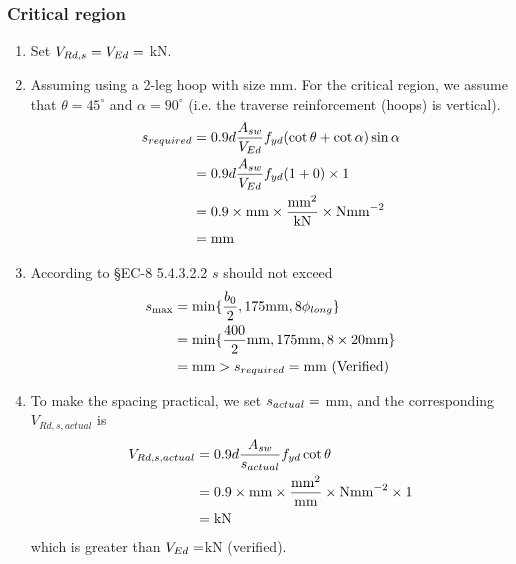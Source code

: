 \subsubsection{Critical region}
\begin{enumerate}
\item Set $V_{Rd,s} = V_{Ed} = \g{VEd}$ kN.
\item Assuming using a 2-leg hoop with size  mm. For the critical
  region, we assume that $\theta = 45 ^{\circ}$ and $\alpha = 90 ^{\circ}$ (i.e.
  the traverse reinforcement (hoops) is vertical).
  \begin{align*}
    s_{required} &= 0.9d \frac{A_{sw}}{V_{Ed}} f_{yd}
                   (\cot \theta + \cot \alpha)\sin \alpha \\
                 &= 0.9d \frac{A_{sw}}{V_{Ed}} f_{yd} (1 + 0) \times 1\\
                 &= 0.9 \times \g{d} \mbox{mm}
                   \times
                   \frac{\g{Asw}\mbox{mm}^{2}}{\g{VEd} \mbox{kN}}
                   \times \g{fyd} \mbox{Nmm}^{-2} \\
                 &= \g{sreq} \mbox{mm}
  \end{align*}
\item According to \S EC-8 5.4.3.2.2 $s$ should not exceed
  \begin{align*}
    s_{\max} &= \min \{
               \frac{b_0}{2}, 175 \mbox{mm}, 8\phi_{long} \} \\
             &= \min \{ \frac{400}{2} \mbox{mm},
               175\mbox{mm}, 8 \times 20 \mbox{mm}\} \\
             &= \g{smax}
               \mbox{mm} > s_{required} = \g{sreq} \mbox{mm (Verified)} \\
  \end{align*}
\item To make the spacing practical, we set $s_{actual} = \g{sact}$ mm, and
  the corresponding $V_{Rd, s, actual} $ is
\begin{align*}
  V_{Rd, s, actual}&= 0.9d \frac{A_{sw}}{s_{actual}}f_{yd}\cot  \theta \\
  &= 0.9 \times \g{d} \mbox{mm}
  \times \frac{\g{Asw} \mbox{mm}^{2}}{\g{sact} \mbox{mm}}
  \times \g{fyd} \mbox{Nmm}^{-2} \times 1 \\
  &= \g{VRdsAct} \mbox{kN}
\end{align*}
  which is greater than $V_{Ed} = \g{VEd} $kN (verified).
\end{enumerate}

